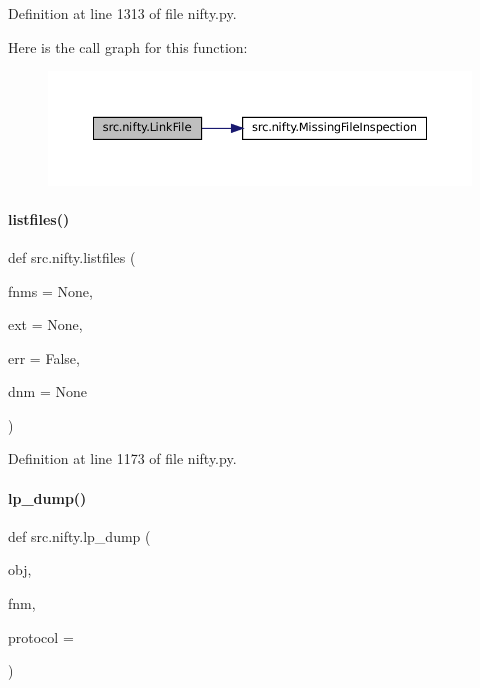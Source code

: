 Definition at line 1313 of file nifty.\+py.

Here is the call graph for this function\+:
\nopagebreak
\begin{figure}[H]
\begin{center}
\leavevmode
\includegraphics[width=350pt]{namespacesrc_1_1nifty_a7fd3a0edb0212c320360d7685227b0f5_cgraph}
\end{center}
\end{figure}
\mbox{\label{namespacesrc_1_1nifty_a127cb144279f51ac1078d210631aeaf7}} 
\paragraph{\texorpdfstring{listfiles()}{listfiles()}}
{\footnotesize\ttfamily def src.\+nifty.\+listfiles (\begin{DoxyParamCaption}\item[{}]{fnms = {\ttfamily None},  }\item[{}]{ext = {\ttfamily None},  }\item[{}]{err = {\ttfamily False},  }\item[{}]{dnm = {\ttfamily None} }\end{DoxyParamCaption})}



Definition at line 1173 of file nifty.\+py.

\mbox{\label{namespacesrc_1_1nifty_aed3eba850f6ddf4538d09ee61d19e4bd}} 
\paragraph{\texorpdfstring{lp\+\_\+dump()}{lp\_dump()}}
{\footnotesize\ttfamily def src.\+nifty.\+lp\+\_\+dump (\begin{DoxyParamCaption}\item[{}]{obj,  }\item[{}]{fnm,  }\item[{}]{protocol = {} }\end{DoxyParamCaption})}



